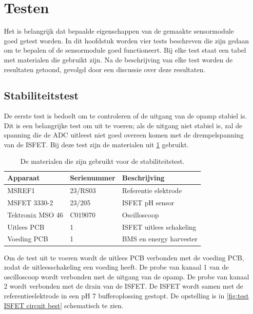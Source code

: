 \section{Testen}

Het is belangrijk dat bepaalde eigenschappen van de gemaakte sensormodule goed getest worden. In dit hoofdstuk worden vier tests beschreven die zijn gedaan om te bepalen of de sensormodule goed functioneert. Bij elke test staat een tabel met materialen die gebruikt zijn. Na de beschrijving van elke test worden de resultaten getoond, gevolgd door een discussie over deze resultaten.


\subsection{Stabiliteitstest}\label{sec:stabiliteitstest}
De eerste test is bedoelt om te controleren of de uitgang van de opamp stabiel is. Dit is een belangrijke test om uit te voeren; als de uitgang niet stabiel is, zal de spanning die de ADC uitleest niet goed overeen komen met de drempelspanning van de ISFET.
Bij deze test zijn de materialen uit \cref{tab:testMaterialen1} gebruikt.
\begin{table}[!htbp]
    \centering
    \begin{tabular}{l|l|l}
        Apparaat         & Serienummer & Beschrijving \\
        \hline
        MSREF1           & 23/RS03     & Referentie elektrode       \\
        MSFET 3330-2     & 23/205      & ISFET pH sensor            \\
        Tektronix MSO 46 & C019070     & Oscilloscoop               \\
        Uitlees PCB      & 1           & ISFET uitlees schakeling   \\
        Voeding PCB      & 1           & BMS en energy harvester    \\
        \hline
    \end{tabular}
    \caption{De materialen die zijn gebruikt voor de stabiliteitstest.}
    \label{tab:testMaterialen1}
\end{table}

Om de test uit te voeren wordt de uitlees PCB verbonden met de voeding PCB, zodat de uitleesschakeling een voeding heeft. De probe van kanaal 1 van de oscilloscoop wordt verbonden met de uitgang van de opamp. De probe van kanaal 2 wordt verbonden met de drain van de ISFET. De ISFET wordt samen met de referentieelektrode in een pH 7 bufferoplossing gestopt. De opstelling is in \cref{fig:test ISFET circuit best} schematisch te zien.

